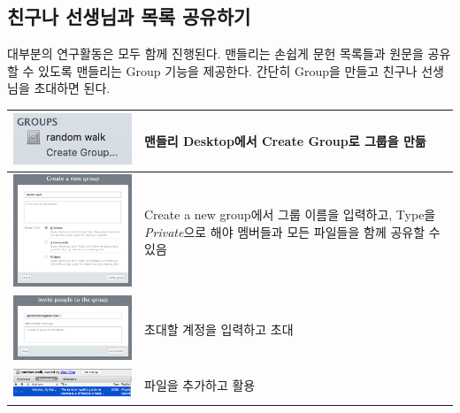 \documentclass[11pt]{article}
\begin{document}
\newpage
\subsection{친구나 선생님과 목록 공유하기}
대부분의 연구활동은 모두 함께 진행된다. 맨들리는 손쉽게 문헌 목록들과 원문을 공유할 수 있도록 맨들리는 Group 기능을 제공한다. 간단히 Group을 만들고 친구나 선생님을 초대하면  된다.\\

\begin{tabular}{ m{11cm} m{50mm} }
	\hline
	\includegraphics[width=5cm]{./image/group5.png} & 맨들리 Desktop에서 \textrm{Create Group}로 그룹을 만듦\\
	\hline
	\includegraphics[width=8cm]{./image/group2.png} & \textrm{Create a new group}에서 그룹 이름을 입력하고, Type을 \textit{Private}으로 해야 멤버들과 모든 파일들을 함께 공유할 수 있음\\
	\hline
	\includegraphics[width=8cm]{./image/group3.png} & 초대할 계정을 입력하고 초대\\
	\hline
	\includegraphics[width=8cm]{./image/group4.png} & 파일을 추가하고 활용\\
\end{tabular}
\end{document}

